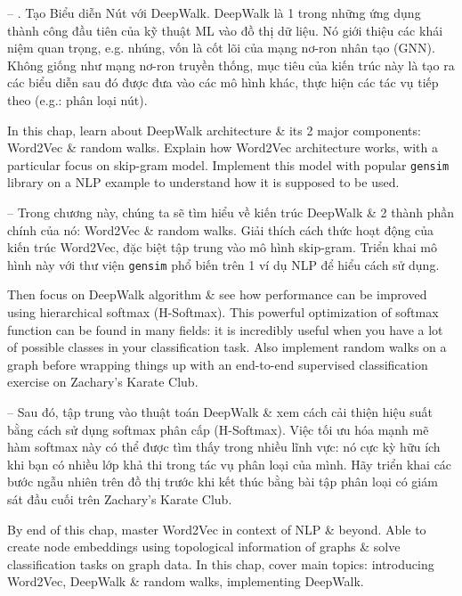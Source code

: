 \documentclass{article}
\begin{document}
\begin{itemize}
    -- {. Tạo Biểu diễn Nút với DeepWalk.} DeepWalk là 1 trong những ứng dụng thành công đầu tiên của kỹ thuật ML vào đồ thị dữ liệu. Nó giới thiệu các khái niệm quan trọng, e.g. nhúng, vốn là cốt lõi của mạng nơ-ron nhân tạo (GNN). Không giống như mạng nơ-ron truyền thống, mục tiêu của kiến trúc này là tạo ra các biểu diễn sau đó được đưa vào các mô hình khác, thực hiện các tác vụ tiếp theo (e.g.: phân loại nút).

    In this chap, learn about DeepWalk architecture \& its 2 major components: Word2Vec \& random walks. Explain how Word2Vec architecture works, with a particular focus on skip-gram model. Implement this model with popular {\tt gensim} library on a NLP example to understand how it is supposed to be used.

    -- Trong chương này, chúng ta sẽ tìm hiểu về kiến trúc DeepWalk \& 2 thành phần chính của nó: Word2Vec \& random walks. Giải thích cách thức hoạt động của kiến trúc Word2Vec, đặc biệt tập trung vào mô hình skip-gram. Triển khai mô hình này với thư viện {\tt gensim} phổ biến trên 1 ví dụ NLP để hiểu cách sử dụng.

    Then focus on DeepWalk algorithm \& see how performance can be improved using hierarchical softmax (H-Softmax). This powerful optimization of softmax function can be found in many fields: it is incredibly useful when you have a lot of possible classes in your classification task. Also implement random walks on a graph before wrapping things up with an end-to-end supervised classification exercise on Zachary's Karate Club.

    -- Sau đó, tập trung vào thuật toán DeepWalk \& xem cách cải thiện hiệu suất bằng cách sử dụng softmax phân cấp (H-Softmax). Việc tối ưu hóa mạnh mẽ hàm softmax này có thể được tìm thấy trong nhiều lĩnh vực: nó cực kỳ hữu ích khi bạn có nhiều lớp khả thi trong tác vụ phân loại của mình. Hãy triển khai các bước ngẫu nhiên trên đồ thị trước khi kết thúc bằng bài tập phân loại có giám sát đầu cuối trên Zachary's Karate Club.

    By end of this chap, master Word2Vec in context of NLP \& beyond. Able to create node embeddings using topological information of graphs \& solve classification tasks on graph data. In this chap, cover main topics: introducing Word2Vec, DeepWalk \& random walks, implementing DeepWalk.


\end{itemize}
\end{document}
